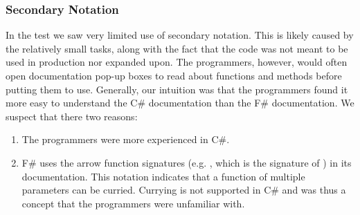 \subsubsection{Secondary Notation}
In the test we saw very limited use of secondary notation. This is likely caused by the relatively small tasks, along with the fact that the code was not meant to be used in production nor expanded upon. The programmers, however, would often open documentation pop-up boxes to read about functions and methods before putting them to use. Generally, our intuition was that the programmers found it more easy to understand the C\# documentation than the F\# documentation. We suspect that there two reasons:
\begin{enumerate}
    \item The programmers were more experienced in C\#.
    \item F\# uses the arrow function signatures (e.g. , which is the signature of ) in its documentation. This notation indicates that a function of multiple parameters can be curried. Currying is not supported in C\# and was thus a concept that the programmers were unfamiliar with.
\end{enumerate}